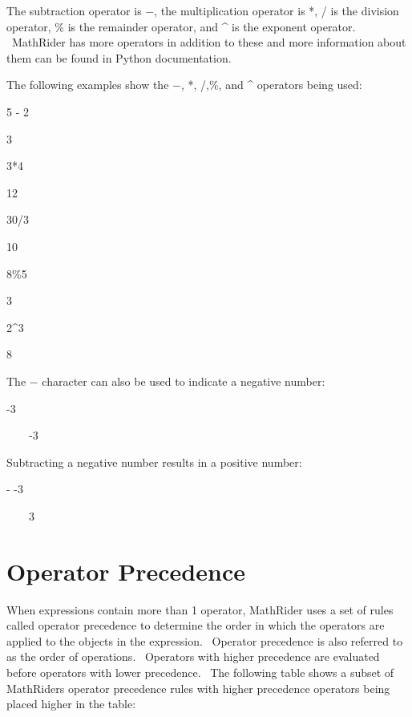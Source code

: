 \documentclass[12pt,twoside]{book}
\begin{document}
\bigskip

The subtraction operator is $-$, the multiplication operator is *, / is the division operator, \% is the remainder operator, and \^{} is the exponent operator. \ MathRider has more operators in addition to these and more information about them can be found in Python documentation. 

\bigskip

The following examples show the $-$, *, /,\%, and \^{} operators being used:


\bigskip

5 {}- 2

{\textbar}

3


\bigskip

3*4

{\textbar}

12


\bigskip

30/3

{\textbar}

10


\bigskip

8\%5

{\textbar}

3


\bigskip

2\^{}3

{\textbar}

8


\bigskip

The $-$ character can also be used to indicate a negative number:


\bigskip

{}-3

{\textbar}

\ \ \ \ {}-3


\bigskip

Subtracting a negative number results in a positive number:


\bigskip

{}- {}-3

{\textbar}

\ \ \ \ 3

\section[Operator Precedence]{Operator Precedence}

When expressions contain more than 1 operator, MathRider uses a set of rules called operator precedence to determine the order in which the operators are applied to the objects in the expression. \ Operator precedence is also referred to as the order of operations. \ Operators with higher precedence are evaluated before operators with lower precedence. \ The following table shows a subset of MathRider{\textquotesingle}s operator precedence rules with higher precedence operators being placed higher in the table: 
\end{document}
